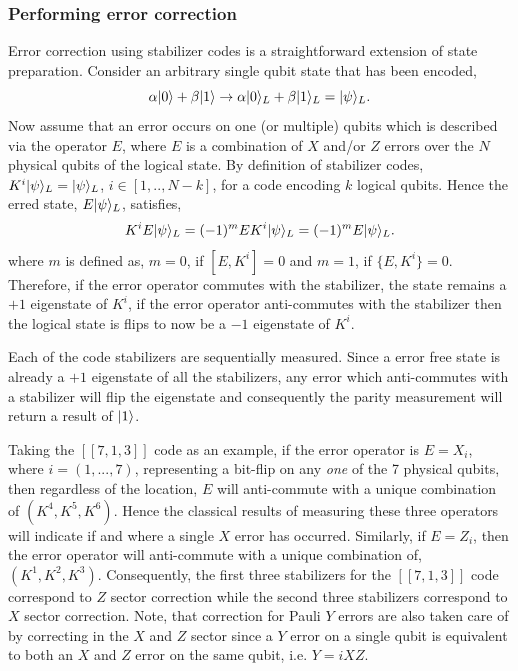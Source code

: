 \subsubsection{Performing error correction}\label{sec:stabilizer_correction}
Error correction using stabilizer codes is a straightforward extension of state preparation.  Consider an arbitrary single 
qubit state that has been encoded, 
\begin{equation}
\alpha\ket{0} + \beta\ket{1} \rightarrow \alpha\ket{0}_L + \beta\ket{1}_L = \ket{\psi}_L.  
\end{equation}
Now assume that an error occurs on one (or multiple) qubits which is described via the operator $E$, where $E$ is 
a combination of $X$ and/or $Z$ errors over the $N$ physical qubits of the logical state.  
By definition of stabilizer 
codes, $K^i|\psi\rangle_L = |\psi\rangle_L$, $i \in [1,..,N-k]$, for a code encoding $k$ logical qubits.  
Hence the erred state, 
$E|\psi\rangle_L$, satisfies,
\begin{equation}
K^iE\ket{\psi}_L = (-1)^m EK^i\ket{\psi}_L = (-1)^m E\ket{\psi}_L.
\end{equation}
where $m$ is defined as, $m=0$, if $[E,K^i]=0$ and $m=1$, if $\{E,K^i\} = 0$.  Therefore, if the error operator commutes 
with the stabilizer, the state remains a $+1$ eigenstate of $K^i$, if the error operator anti-commutes with the 
stabilizer then the logical state is flips to now be a $-1$ eigenstate of $K^i$.  

Each of the code 
stabilizers are sequentially measured.  Since a error free state is already a $+1$ eigenstate of all the 
stabilizers, any error which anti-commutes with a stabilizer will flip the eigenstate and consequently the 
parity measurement will return a result of $|1\rangle$.

Taking the $[[7,1,3]]$ code as an example, if the error operator is 
$E = X_i$, where $i = (1,...,7)$, 
representing a bit-flip on any {\em one} of the 7 physical qubits, then regardless of the location, $E$ will 
anti-commute with a unique combination of $(K^4,K^5,K^6)$.  Hence the classical results of measuring these 
three operators will indicate if and where a single $X$ error has occurred.  Similarly, if $E=Z_i$, then the 
error operator will anti-commute with a unique combination of, $(K^1,K^2,K^3)$.  Consequently, the first three 
stabilizers for the $[[7,1,3]]$ code correspond to $Z$ sector correction 
while the second three stabilizers correspond to $X$ sector correction.  Note, that correction for Pauli $Y$ errors 
are also taken care of by correcting in the $X$ and $Z$ sector since a $Y$ error on a single qubit is 
equivalent to both an $X$ and $Z$ error on the same qubit, i.e. $Y = iXZ$.  

